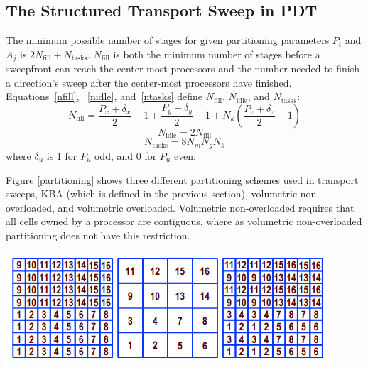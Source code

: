 \documentclass[11pt, letterpaper,titlepage,oneside]{article}
\begin{document}
\subsection{The Structured Transport Sweep in PDT}
The minimum possible number of stages for given partitioning parameters $P_i$ and $A_j$ is $2 N_{\text{fill}}+N_{\text{tasks}}$. $N_{\text{fill}}$ is both the minimum number of stages before a sweepfront can reach the center-most processors and the number needed to finish a direction's sweep after the center-most processors have finished. Equations~\eqref{nfill}, ~\eqref{nidle}, and~\eqref{ntasks} define $N_{\text{fill}}$, $N_{\text{idle}}$, and $N_{\text{tasks}}$:
\begin{equation}
N_{\text{fill}} = \frac{P_x + \delta_x}{2} - 1 + \frac{P_y + \delta_y}{2} - 1 + N_k (\frac{P_z + \delta_z}{2} - 1)
\label{nfill}
\end{equation}
\begin{equation}
N_{\text{idle}} = 2 N_{\text{fill}}
\label{nidle}
\end{equation}
\begin{equation}
N_{\text{tasks}} = 8 N_m N_g N_k
\label{ntasks}
\end{equation}
where $\delta_u$ is 1 for $P_u$ odd, and 0 for $P_u$ even.

Figure \ref{partitioning} shows three different partitioning schemes used in transport sweeps, KBA (which is defined in the previous section), volumetric non-overloaded, and volumetric overloaded. Volumetric non-overloaded requires that all cells owned by a processor are contiguous, where as volumetric non-overloaded partitioning does not have this restriction.  

\noindent\begin{minipage}{\textwidth}
\centering
\includegraphics[scale = 1]{Partitioning.png}
\label{partitioning}
\end{minipage}
\end{document}
